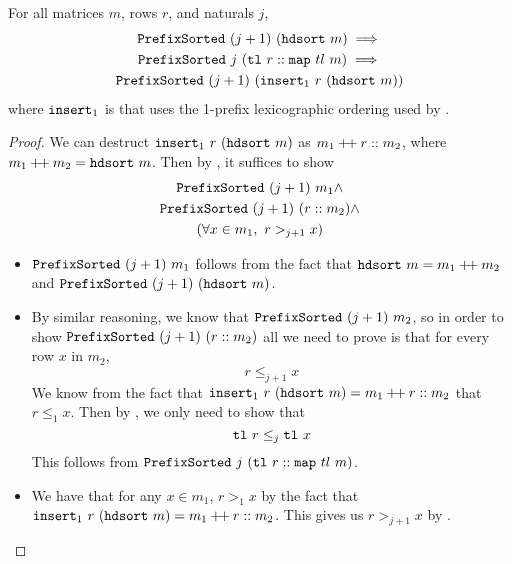 \documentclass[sigplan,10pt,anonymous,review]{thesis}
\begin{document}
\begin{lemma}
  For all matrices $m$, rows $r$, and naturals $j$,
  \begin{gather*}
    \texttt{\textup{PrefixSorted}}~(j+1)~(\texttt{\textup{hdsort}}~m) \implies \\
    \texttt{\textup{PrefixSorted}}~j~(\texttt{\textup{tl}}~r :: \texttt{\textup{map}}~{tl}~m) \implies \\
    \texttt{\textup{PrefixSorted}}~(j+1)~(\texttt{\textup{insert}}_1~r~(\texttt{\textup{hdsort}}~m))
  \end{gather*}
  where $\texttt{\textup{insert}}_1$ is  that uses the 1-prefix
  lexicographic ordering used by .
\end{lemma}
\begin{proof}
  We can destruct $\texttt{\textup{insert}}_1~r~(\texttt{\textup{hdsort}}~m)$ as $m_1 \mathbin{+\mkern-3mu+} r
  :: m_2$, where $m_1 \mathbin{+\mkern-3mu+} m_2 = \texttt{\textup{hdsort}}~m$. Then by
  , it suffices to show
  \begin{gather*}
    \texttt{\textup{PrefixSorted}}~(j+1)~m_1 \land \\
    \texttt{\textup{PrefixSorted}}~(j+1)~(r :: m_2) \land \\
    (\forall x \in m_1,~ r >_{j+1} x)
  \end{gather*}
  \begin{itemize}
  \item $\texttt{\textup{PrefixSorted}}~(j+1)~m_1$ follows from the fact that
    $\texttt{\textup{hdsort}}~m = m_1 \mathbin{+\mkern-3mu+} m_2$ and
    $\texttt{\textup{PrefixSorted}}~(j+1)~(\texttt{\textup{hdsort}}~m)$.
  \item By similar reasoning, we know that
    $\texttt{\textup{PrefixSorted}}~(j+1)~m_2$, so in order to show
    $\texttt{\textup{PrefixSorted}}~(j+1)~(r :: m_2)$ all we need to prove is that
    for every row $x$ in $m_2$,
    \begin{equation*}
      r \le_{j+1} x
    \end{equation*}
    We know from the fact that $\texttt{\textup{insert}}_1~r~(\texttt{\textup{hdsort}}~m) =
    m_1 \mathbin{+\mkern-3mu+} r :: m_2$ that $r \le_1 x$. Then by ,
    we only need to show that
    \begin{equation*}
      \texttt{\textup{tl}}~r \le_j \texttt{\textup{tl}}~x
    \end{equation*}
    This follows from $\texttt{\textup{PrefixSorted}}~j~(\texttt{\textup{tl}}~r :: \texttt{\textup{map}}~{tl}~m)$.
  \item We have that for any $x \in m_1$, $r >_1 x$ by the fact that
    $\texttt{\textup{insert}}_1~r~(\texttt{\textup{hdsort}}~m) = m_1 \mathbin{+\mkern-3mu+} r :: m_2$. This
    gives us $r >_{j+1} x$ by . \qedhere
  \end{itemize}
\end{proof}
\end{document}
